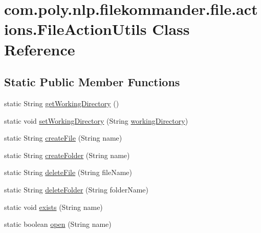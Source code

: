 \hypertarget{classcom_1_1poly_1_1nlp_1_1filekommander_1_1file_1_1actions_1_1_file_action_utils}{\section{com.\-poly.\-nlp.\-filekommander.\-file.\-actions.\-File\-Action\-Utils Class Reference}
\label{classcom_1_1poly_1_1nlp_1_1filekommander_1_1file_1_1actions_1_1_file_action_utils}
}
\subsection*{Static Public Member Functions}
\begin{DoxyCompactItemize}
\item 
static String \hyperlink{classcom_1_1poly_1_1nlp_1_1filekommander_1_1file_1_1actions_1_1_file_action_utils_a322374face7f551b379f23ddb6a235b9}{get\-Working\-Directory} ()
\item 
static void \hyperlink{classcom_1_1poly_1_1nlp_1_1filekommander_1_1file_1_1actions_1_1_file_action_utils_ae355d7d7cf883ff39ffe96a1bde89576}{set\-Working\-Directory} (String \hyperlink{classcom_1_1poly_1_1nlp_1_1filekommander_1_1file_1_1actions_1_1_file_action_utils_ad54a8fdc9145d2f423c54cb1597f874a}{working\-Directory})
\item 
static String \hyperlink{classcom_1_1poly_1_1nlp_1_1filekommander_1_1file_1_1actions_1_1_file_action_utils_aac7f019247f469c1ea84e1a9e158e161}{create\-File} (String name)
\item 
static String \hyperlink{classcom_1_1poly_1_1nlp_1_1filekommander_1_1file_1_1actions_1_1_file_action_utils_a8cba8b4dc29efed981108c8cbd09e40b}{create\-Folder} (String name)
\item 
static String \hyperlink{classcom_1_1poly_1_1nlp_1_1filekommander_1_1file_1_1actions_1_1_file_action_utils_ac256836b0ce9fbf8c92a6315328e641f}{delete\-File} (String file\-Name)
\item 
static String \hyperlink{classcom_1_1poly_1_1nlp_1_1filekommander_1_1file_1_1actions_1_1_file_action_utils_a061f74de68076705a673624a99d993c6}{delete\-Folder} (String folder\-Name)
\item 
static void \hyperlink{classcom_1_1poly_1_1nlp_1_1filekommander_1_1file_1_1actions_1_1_file_action_utils_af5404810d59392650661f3a3fb7f47ce}{exists} (String name)
\item 
static boolean \hyperlink{classcom_1_1poly_1_1nlp_1_1filekommander_1_1file_1_1actions_1_1_file_action_utils_a127d6dea53d3df50906584a9dcd8394a}{open} (String name)

\end{DoxyCompactItemize}
